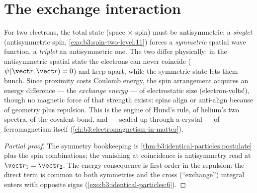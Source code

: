 \section{The exchange interaction}

\begin{proposition}\label{prop:b3:identical-particles:exchange-force}
For two electrons, the total state (space $\times$ spin) must be
antisymmetric: a \emph{singlet} (antisymmetric spin,
\cref{exo:b3:spin-two-level:11}) forces a \emph{symmetric} spatial
wave function, a \emph{triplet} an antisymmetric one. The two differ
physically: in the antisymmetric spatial state the electrons can
never coincide ($\psi(\vect r, \vect r) = 0$) and keep apart, while
the symmetric state lets them bunch. Since proximity costs Coulomb
energy, the spin arrangement acquires an energy difference --- the
\emph{exchange energy} --- of electrostatic size (electron-volts!),
though no magnetic force of that strength exists: spins align or
anti-align because of geometry plus repulsion. This is the engine of
Hund's rule, of helium's two spectra, of the covalent bond, and ---
scaled up through a crystal --- of ferromagnetism itself
(\cref{ch:b3:electromagnetism-in-matter}).
\end{proposition}

\begin{proof}[Partial proof]
The symmetry bookkeeping is
\cref{thm:b3:identical-particles:postulate} plus the spin
combinations; the vanishing at coincidence is antisymmetry read at
$\vect r_1 = \vect r_2$. The energy consequence is first-order
 in the repulsion: the direct term is common to
both symmetries and the cross (``exchange'') integral enters with
opposite signs (\cref{exo:b3:identical-particles:6}).
\end{proof}

